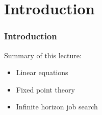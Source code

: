 


\subtitle{Prelude to Dynamic Programming}

\author{John Stachurski}

\date{September 2022}




\begin{frame}
  \titlepage
\end{frame}


\section{Introduction}


\begin{frame}
    \frametitle{Introduction}

    Summary of this lecture:

    \begin{itemize}
        \item Linear equations
            \vspace{0.3em}
        \item Fixed point theory
            \vspace{0.3em}
        \item Infinite horizon job search
    \end{itemize}

            \vspace{0.3em}
            \vspace{0.3em}


\end{frame}



